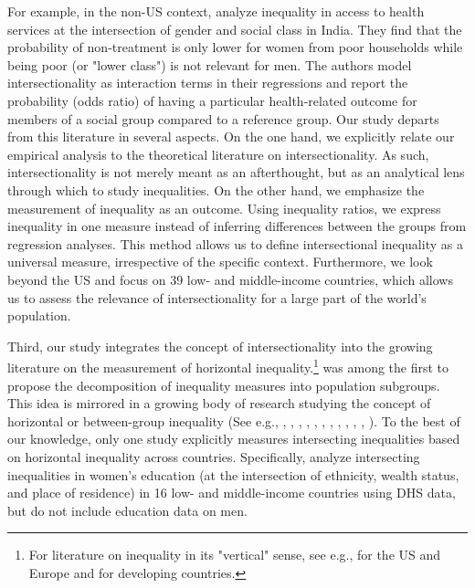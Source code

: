 For example, in the non-US context, \cite{Sen2009} analyze inequality in access to health services at the intersection of gender and social class in India. They find that the probability of non-treatment is only lower for women from poor households while being poor (or "lower class") is not relevant for men. The authors model intersectionality as interaction terms in their regressions and report the probability (odds ratio) of having a particular health-related outcome for members of a social group compared to a reference group. Our study departs from this literature in several aspects. On the one hand, we explicitly relate our empirical analysis to the theoretical literature on intersectionality. As such, intersectionality is not merely meant as an afterthought, but as an analytical lens through which to study inequalities. On the other hand, we emphasize the measurement of inequality as an outcome. Using inequality ratios, we express inequality in one measure instead of inferring differences between the groups from regression analyses. This method allows us to define intersectional inequality as a universal measure, irrespective of the specific context. Furthermore, we look beyond the US and focus on 39 low- and middle-income countries, which allows us to assess the relevance of intersectionality for a large part of the world's population.

Third, our study integrates the concept of intersectionality into the growing literature on the measurement of horizontal inequality.\footnote{For literature on inequality in its "vertical" sense, see e.g., \cite{Piketty2014} for the US and Europe and \cite{Ravallion2014} for developing countries.} \cite{Shorrocks1984} was among the first to propose the decomposition of inequality measures into population subgroups. This idea is mirrored in a growing body of research studying the concept of horizontal or between-group inequality (See e.g., \cite{Langer2005}, \cite{Langer2007}, \cite{Mancini2008}, \cite{Mancini2008a}, \cite{Stewart2009}, \cite{Elbers2008}, \cite{Cederman2011}, \cite{Cederman2015}, \cite{Canelas2018}, \cite{Leivas2018}, \cite{McDoom2019}, \cite{Tetteh-Baah2019}). To the best of our knowledge, only one study explicitly measures intersecting inequalities based on horizontal inequality across countries. Specifically, \cite{Lenhardt2015} analyze intersecting inequalities in women's education (at the intersection of ethnicity, wealth status, and place of residence) in 16 low- and middle-income countries using DHS data, but do not include education data on men.

